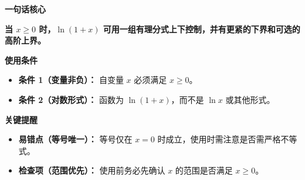 \begin{summarybox}
\textbf{\textcolor{CSummary}{一句话核心}}

\textbf{当 $x\geq0$ 时，$\ln(1+x)$ 可用一组有理分式上下控制，并有更紧的下界和可选的高阶上界。}

\medskip
\textbf{\textcolor{CSummary}{使用条件}}
\begin{itemize}[leftmargin=*, itemsep=0.5em, topsep=0.4em]
    \item \textbf{条件 1（变量非负）：} 自变量 $x$ 必须满足 $x\geq0$。
    \item \textbf{条件 2（对数形式）：} 函数为 $\ln(1+x)$，而不是 $\ln x$ 或其他形式。
\end{itemize}

\medskip
\textbf{\textcolor{CSummary}{关键提醒}}
\begin{itemize}[leftmargin=*, itemsep=0.5em, topsep=0.4em]
    \item \textbf{易错点（等号唯一）：} 等号仅在 $x=0$ 时成立，使用时需注意是否需严格不等式。
    \item \textbf{检查项（范围优先）：} 使用前务必先确认 $x$ 的范围是否满足 $x\geq0$。
\end{itemize}
\end{summarybox}
